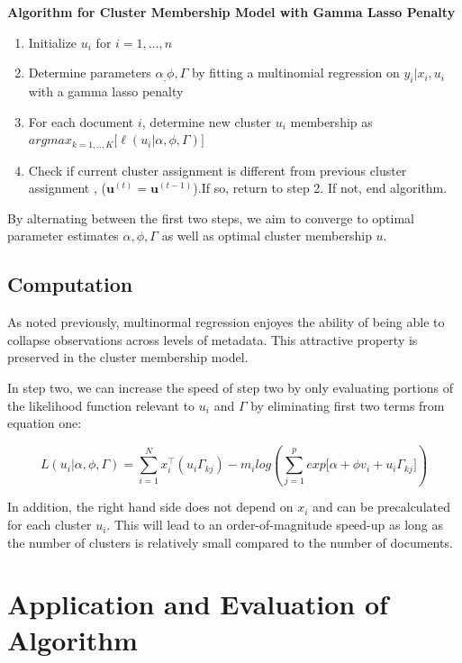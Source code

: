 \documentclass[12pt]{article}
\begin{document}
\textbf{Algorithm for Cluster Membership Model with Gamma Lasso Penalty}
\begin{enumerate}
\def\labelenumi{\arabic{enumi}.}
\item
 Initialize $u_i$ for $i = 1, \dots, n$
\item
  Determine parameters $\alpha_, \phi, \Gamma$ by fitting a multinomial
  regression on $y_i | x_i , u_i$ with a gamma lasso penalty
\item
  For each document $i$, determine new cluster $u_i$ membership as \\
  $argmax_{k = 1,..,K} \big[  \ell(u_i| \alpha, \phi, \Gamma) \big]$
\item 
Check if current cluster assignment is different from previous cluster assignment , ($\textbf{u}^{(t)}  = \textbf{u}^{(t-1)}$).If so, return to step 2. If not, end algorithm.
\end{enumerate}


By alternating between the first two steps, we aim to converge to optimal
parameter estimates $\alpha, \phi, \Gamma$ as well as optimal cluster
membership $u$.
\subsection{Computation}\label{computation}
As noted previously, multinormal regression enjoyes the ability of being able to
collapse observations across levels of metadata. This attractive
property is preserved in the cluster membership model.

In step two, we can increase the speed of step two by only evaluating portions of the likelihood function relevant to $u_i$ and $\Gamma$ by eliminating first two terms from equation one:

\begin{equation} 
L(u_i|\alpha,\phi,\Gamma) = \sum_{i = 1}^{N}{ x_i^\top (u_i \Gamma_{kj})} - m_i log(\sum_{j = 1}^{p}{exp{\big[ \alpha + \phi v_i + u_i \Gamma_{kj} \big]}})
\end{equation}

In addition, the right hand side does not depend on $x_i$ and can be precalculated for each cluster $u_i$. This will lead to an order-of-magnitude speed-up as long as the number of clusters is relatively small compared to the number of documents. 



\section{Application and Evaluation of Algorithm}\label{application}
\end{document}
